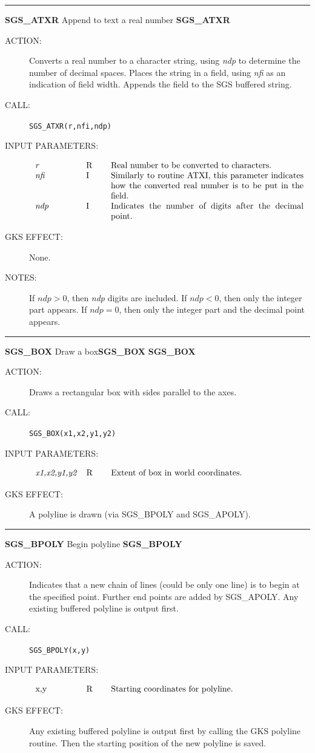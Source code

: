 \documentclass[11pt]{article}
\newcommand{\htmlref}[2]{#1}
\newcommand{\xlabel}[1]{}
\newcommand{\rthead}[2]{\rule{\textwidth}{0.3mm}
{\Large {\bf #1} \hfill #2 \hfill {\bf #1}}}
\newenvironment{params}%
{\[\begin{tabular}{p{0.14\textwidth}p{0.05\textwidth}p{0.66\textwidth}}}%
{\end{tabular}\]}
\newcommand{\rparams}[3]{{\em #1} &#2 &#3\\}
\newcommand{\rthead}[2]{\subsection{\label{#1}\xlabel{#1}#1 - #2}}
\newenvironment{params}{\begin{description}}{\end{description}}
\newcommand{\rparams}[3]{\item{{\em #1}} (#2) #3}
\begin{document}
\rthead{SGS\_ATXR}{Append to text a real number}
\begin{description}
\item [ACTION:]
Converts a real number to a character string, using {\em ndp}\/ to determine the
number of decimal spaces.
Places the string in a field, using {\em nfi}\/ as an indication of field width.
Appends the field to the SGS buffered string.
\item [CALL:]
{\tt SGS\_ATXR(r,nfi,ndp)}
\item [INPUT PARAMETERS:]
\begin{params}
\rparams{r}{R}{Real number to be converted to characters.}
\rparams{nfi}{I}{Similarly to routine ATXI, this parameter indicates how the
converted real number is to be put in the field.}
\rparams{ndp}{I}{Indicates the number of digits after the decimal point.}
\end{params}
\item [GKS EFFECT:]
None.
\item [NOTES:]
If $\mathit{ndp}>0$, then {\it ndp}\/ digits are included.
If $\mathit{ndp}<0$, then only the integer part appears.
If $\mathit{ndp}=0$, then only the integer part and the decimal point appears.
\end{description}
\goodbreak

\rthead{SGS\_BOX}{Draw a box\hfill {\bf SGS\_BOX}}
\begin{description}
\item [ACTION:]
Draws a rectangular box with sides parallel to the axes.
\item [CALL:]
{\tt SGS\_BOX(x1,x2,y1,y2)}
\item [INPUT PARAMETERS:]
\begin{params}
\rparams{x1,x2,y1,y2}{R}{Extent of box in world coordinates.}
\end{params}
\item [GKS EFFECT:]
A polyline is drawn (via \htmlref{SGS\_BPOLY}{SGS_BPOLY} and 
\htmlref{SGS\_APOLY}{SGS_APOLY}).
\end{description}
\goodbreak

\rthead{SGS\_BPOLY}{Begin polyline}
\begin{description}
\item [ACTION:]
Indicates that a new chain of lines (could be only one line) is to begin at the
specified point.
Further end points are added by \htmlref{SGS\_APOLY}{SGS_APOLY}.
Any existing buffered polyline is output first.
\item [CALL:]
{\tt SGS\_BPOLY(x,y)}
\item [INPUT PARAMETERS:]
\begin{params}
\rparams{\em x,y}{R}{Starting coordinates for polyline.}
\end{params}
\item [GKS EFFECT:]
Any existing buffered polyline is output first by calling the GKS polyline
routine.
Then the starting position of the new polyline is saved.
\end{description}
\goodbreak
\end{document}
